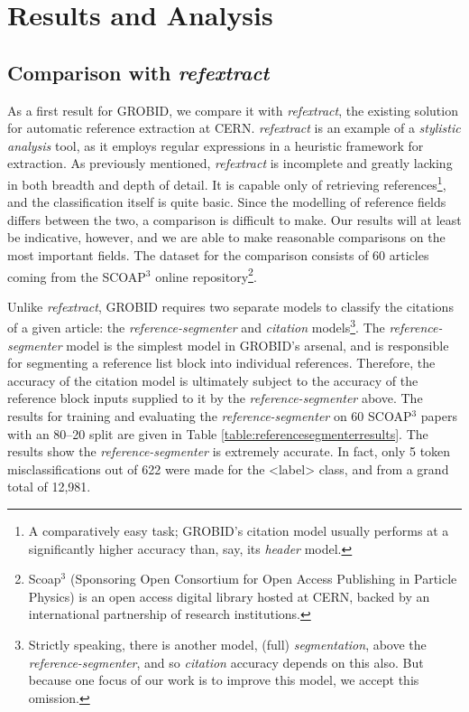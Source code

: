 
\chapter{Results and Analysis} %

\label{Chapter5} %


\section{Comparison with \emph{refextract}}

As a first result for GROBID, we compare it with \emph{refextract}, the existing solution for automatic reference extraction at CERN. \emph{refextract} is an example of a \emph{stylistic analysis} tool, as it employs regular expressions in a heuristic framework for extraction. As previously mentioned, \emph{refextract} is incomplete and greatly lacking in both breadth and depth of detail. It is capable only of retrieving references\footnote{A comparatively easy task; GROBID's citation model usually performs at a significantly higher accuracy than, say, its \emph{header} model.}, and the classification itself is quite basic. Since the modelling of reference fields differs between the two, a comparison is difficult to make. Our results will at least be indicative, however, and we are able to make reasonable comparisons on the most important fields. The dataset for the comparison consists of 60 articles coming from the SCOAP$^3$ online repository\footnote{Scoap$^3$ (Sponsoring Open Consortium for Open Access Publishing in Particle Physics) is an open access digital library hosted at CERN, backed by an international partnership of research institutions.}.

Unlike \emph{refextract}, GROBID requires two separate models to classify the citations of a given article: the \emph{reference-segmenter} and \emph{citation} models\footnote{Strictly speaking, there is another model, (full) \emph{segmentation}, above the \emph{reference-segmenter}, and so \emph{citation} accuracy depends on this also. But because one focus of our work is to improve this model, we accept this omission.}. The \emph{reference-segmenter} model is the simplest model in GROBID's arsenal, and is responsible for segmenting a reference list block into individual references. Therefore, the accuracy of the citation model is ultimately subject to the accuracy of the reference block inputs supplied to it by the \emph{reference-segmenter} above. The results for training and evaluating the \emph{reference-segmenter} on 60 SCOAP$^3$ papers with an 80--20 split are given in Table \ref{table:referencesegmenterresults}. The results show the \emph{reference-segmenter} is extremely accurate. In fact, only 5 token misclassifications out of 622 were made for the <label> class, and from a grand total of 12,981.

